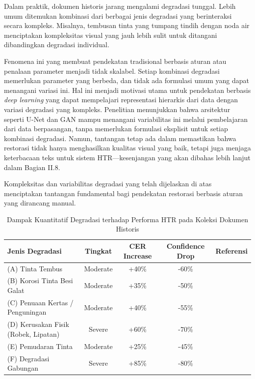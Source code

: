 \vspace{1.5ex}

Dalam praktik, dokumen historis jarang mengalami degradasi tunggal. Lebih umum ditemukan kombinasi dari berbagai jenis degradasi yang berinteraksi secara kompleks. Misalnya, tembusan tinta yang tumpang tindih dengan noda air menciptakan kompleksitas visual yang jauh lebih sulit untuk ditangani dibandingkan degradasi individual.

Fenomena ini yang membuat pendekatan tradisional berbasis aturan atau penalaan parameter menjadi tidak skalabel. Setiap kombinasi degradasi memerlukan parameter yang berbeda, dan tidak ada formulasi umum yang dapat menangani variasi ini. Hal ini menjadi motivasi utama untuk pendekatan berbasis \textit{deep learning} yang dapat mempelajari representasi hierarkis dari data dengan variasi degradasi yang kompleks. Penelitian menunjukkan bahwa arsitektur seperti U-Net \citep{ronneberger2015unet} dan GAN \citep{goodfellow2014} mampu menangani variabilitas ini melalui pembelajaran dari data berpasangan, tanpa memerlukan formulasi eksplisit untuk setiap kombinasi degradasi. Namun, tantangan tetap ada dalam memastikan bahwa restorasi tidak hanya menghasilkan kualitas visual yang baik, tetapi juga menjaga keterbacaan teks untuk sistem HTR—kesenjangan yang akan dibahas lebih lanjut dalam Bagian II.8.

\vspace{1.5ex}

Kompleksitas dan variabilitas degradasi yang telah dijelaskan di atas menciptakan tantangan fundamental bagi pendekatan restorasi berbasis aturan yang dirancang manual.

\begin{table}[H]
\centering
\caption{Dampak Kuantitatif Degradasi terhadap Performa HTR pada Koleksi Dokumen Historis}
\label{tab:degradation-impact}
\scriptsize
\begin{tabular}{|p{2.8cm}|c|c|c|p{2.5cm}|}
\hline
\textbf{Jenis Degradasi} & \textbf{Tingkat} & \textbf{CER Increase} & \textbf{Confidence Drop} & \textbf{Referensi} \\
\hline
(A) Tinta Tembus & Moderate & +40\% & -60\% & \citep{gatos2006} \\
\hline
(B) Korosi Tinta Besi Galat & Moderate & +35\% & -50\% & \citep{neevel1995, krekel1999} \\
\hline
(C) Penuaan Kertas / Penguningan & Moderate & +40\% & -55\% & \citep{reilly1993, porck2000} \\
\hline
(D) Kerusakan Fisik (Robek, Lipatan) & Severe & +60\% & -70\% & \citep{gatos2006} \\
\hline
(E) Pemudaran Tinta & Moderate & +25\% & -45\% & \citep{pratikakis2013} \\
\hline
(F) Degradasi Gabungan & Severe & +85\% & -80\% & \citep{textdiae2022} \\
\hline
\end{tabular}
\end{table}

